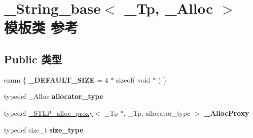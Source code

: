 \hypertarget{class___string__base}{}\section{\+\_\+\+String\+\_\+base$<$ \+\_\+\+Tp, \+\_\+\+Alloc $>$ 模板类 参考}
\label{class___string__base}
\subsection*{Public 类型}
\begin{DoxyCompactItemize}
\item 
\mbox{\label{class___string__base_ade3f7c7ea8725c489712f7fb67d657d9}} 
enum \{ {\bfseries \+\_\+\+D\+E\+F\+A\+U\+L\+T\+\_\+\+S\+I\+ZE} = 4 $\ast$ sizeof( void $\ast$ )
 \}
\item 
\mbox{\label{class___string__base_abb2fa4274092b01fa8ab99e76e56c46c}} 
typedef \+\_\+\+Alloc {\bfseries allocator\+\_\+type}
\item 
\mbox{\label{class___string__base_a22ecd8fcbd4a5991ee9876eb58184329}} 
typedef \hyperlink{class___s_t_l_p__alloc__proxy}{\+\_\+\+S\+T\+L\+P\+\_\+alloc\+\_\+proxy}$<$ \+\_\+\+Tp $\ast$, \+\_\+\+Tp, allocator\+\_\+type $>$ {\bfseries \+\_\+\+Alloc\+Proxy}
\item 
\mbox{\label{class___string__base_a9f1a0c5b21874ce85191b5b2558ba692}} 
typedef size\+\_\+t {\bfseries size\+\_\+type}
\end{DoxyCompactItemize}
